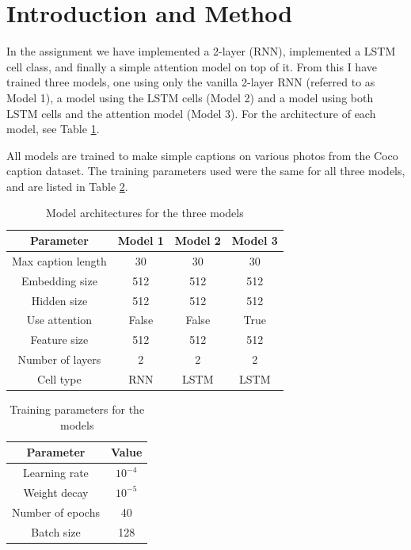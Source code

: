 \section*{Introduction and Method}

In the assignment we have implemented a 2-layer (RNN), implemented a LSTM cell class, and finally a simple attention model on top of it.
From this I have trained three models, one using only the vanilla 2-layer RNN (referred to as Model 1), a model using the LSTM cells (Model 2) and a model using both LSTM cells and the attention model (Model 3). For the architecture of each model, see Table \ref{tab:models_arch}.

All models are trained to make simple captions on various photos from the Coco caption dataset.
The training parameters used were the same for all three models, and are listed in Table \ref{tab:models_train}.

\begin{table}[h]
    \centering
    \begin{tabular}{|c|c|c|c|}
        \hline
        Parameter & Model 1 & Model 2 & Model 3 
        \\ \hline
        Max caption length & 30 & 30 & 30
        \\ \hline
        Embedding size & 512 & 512 & 512
        \\ \hline
        Hidden size & 512 & 512 & 512
        \\ \hline
        Use attention & False & False & True
        \\ \hline
        Feature size & 512 & 512 & 512
        \\ \hline
        Number of layers & 2 & 2 & 2
        \\ \hline
        Cell type & RNN & LSTM & LSTM
        \\ \hline
    \end{tabular}
    \caption{Model architectures for the three models}
    \label{tab:models_arch}
\end{table}

\begin{table}[h]
    \centering
    \begin{tabular}{|c|c|}
        \hline
        Parameter & Value 
        \\ \hline
        Learning rate & $10^{-4}$
        \\ \hline
        Weight decay & $10^{-5}$
        \\ \hline
        Number of epochs & 40
        \\ \hline
        Batch size & 128
        \\ \hline
    \end{tabular}
    \caption{Training parameters for the models}
    \label{tab:models_train}
\end{table}



